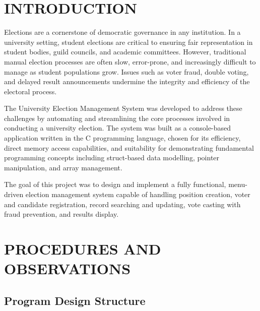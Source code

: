 \documentclass[12pt,a4paper]{article}
\begin{document}
\newpage
\section{INTRODUCTION}

Elections are a cornerstone of democratic governance in any institution. In a
university setting, student elections are critical to ensuring fair representation in
student bodies, guild councils, and academic committees. However, traditional manual
election processes are often slow, error-prone, and increasingly difficult to manage as
student populations grow. Issues such as voter fraud, double voting, and delayed
result announcements undermine the integrity and efficiency of the electoral process.

The University Election Management System was developed to address these challenges
by automating and streamlining the core processes involved in conducting a university
election. The system was built as a console-based application written in the C
programming language, chosen for its efficiency, direct memory access capabilities,
and suitability for demonstrating fundamental programming concepts including
struct-based data modelling, pointer manipulation, and array management.

The goal of this project was to design and implement a fully functional, menu-driven
election management system capable of handling position creation, voter and candidate
registration, record searching and updating, vote casting with fraud prevention, and
results display.

\newpage
\section{PROCEDURES AND OBSERVATIONS}

\subsection{Program Design Structure}
\end{document}
